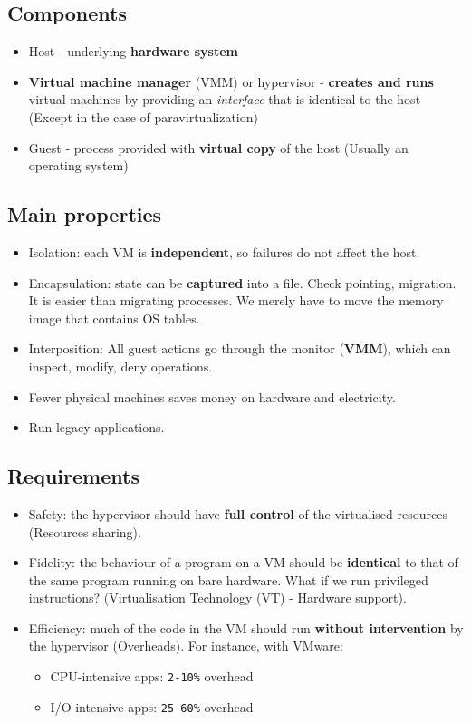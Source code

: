 \documentclass{article}
\begin{document}
\subsection{Components}
\begin{itemize}
	\item Host - underlying \textbf{hardware system}
	\item \textbf{Virtual machine manager} (VMM) or hypervisor - \textbf{creates and runs} virtual machines by providing an \textit{interface} that is identical to the host (Except in the case of paravirtualization)
	\item Guest - process provided with \textbf{virtual copy} of the host (Usually an operating system)
\end{itemize}

\subsection{Main properties}
\begin{itemize}
	\item Isolation: each VM is \textbf{independent}, so failures do not affect the host.
	\item Encapsulation: state can be \textbf{captured} into a file. Check pointing, migration. It is easier than migrating processes. We merely have to move the memory image that contains OS tables.
	\item Interposition: All guest actions go through the monitor (\textbf{VMM}), which can inspect, modify, deny operations.
	\item Fewer physical machines saves money on hardware and electricity.
	\item Run legacy applications.
\end{itemize}

\subsection{Requirements}
\begin{itemize}
	\item Safety: the hypervisor should have \textbf{full control} of the virtualised resources (Resources sharing).
	\item Fidelity: the behaviour of a program on a VM should be \textbf{identical} to that of the same program running on bare hardware. What if we run privileged instructions? (Virtualisation Technology (VT) - Hardware support). 
	\item Efficiency: much of the code in the VM should run \textbf{without intervention} by the hypervisor (Overheads). For instance, with VMware:
	\begin{itemize}
		\item CPU-intensive apps: \verb!2-10%! overhead
		\item I/O intensive apps: \verb!25-60%! overhead
	\end{itemize}
\end{itemize}
\end{document}
